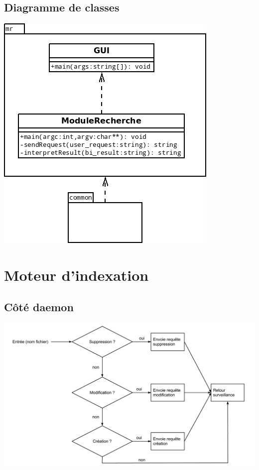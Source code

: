 \subsection{Diagramme de classes}\label{diagramme_classes_mr}
\begin{center}
\includegraphics[scale=0.6]{"images/diagramme_classes_mr"}
\end{center}

\newpage

\section{Moteur d'indexation}

\subsection{Côté daemon}\label{decision-daemon}
\begin{center}
\includegraphics[scale=0.37]{"images/decision_mi"}
\end{center}

